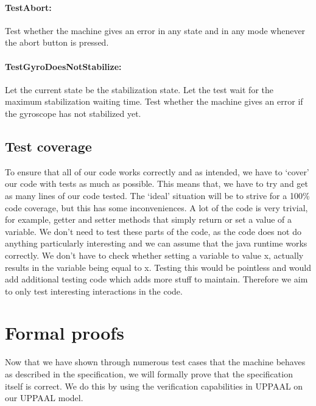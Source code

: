 \documentclass[a4paper,oneside,11pt]{article}
\begin{document}
\paragraph{TestAbort:}
Test whether the machine gives an error in any state and in any mode whenever the abort button is pressed.

\paragraph{TestGyroDoesNotStabilize:}
Let the current state be the stabilization state. Let the test wait for the maximum stabilization waiting time. Test whether the machine gives an error if the gyroscope has not stabilized yet.

\subsection{Test coverage}
To ensure that all of our code works correctly and as intended, we have to ‘cover’ our code with tests as much as possible. This means that, we have to try and get as many lines of our code tested. The ‘ideal’ situation will be to strive for a 100\% code coverage, but this has some inconveniences. A lot of the code is very trivial, for example, getter and setter methods that simply return or set a value of a variable. We don’t need to test these parts of the code, as the code does not do anything particularly interesting and we can assume that the java runtime works correctly. We don’t have to check whether setting a variable to value x, actually results in the variable being equal to x. Testing this would be pointless and would add additional testing code which adds more stuff to maintain. Therefore we aim to only test interesting interactions in the code.

\section{Formal proofs}
Now that we have shown through numerous test cases that the machine behaves as described in the specification, we will formally prove that the specification itself is correct. We do this by using the verification capabilities in UPPAAL on our UPPAAL model.
\end{document}
